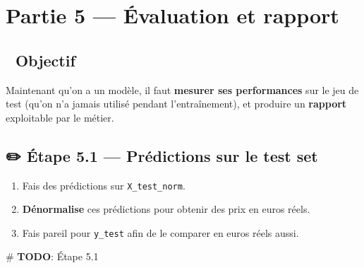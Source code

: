 \documentclass[
  french,
  11pt,
  a4paper,
]{scrbook}
\newenvironment{Shaded}{}{}
\newcommand{\AlertTok}[1]{\textcolor[rgb]{1.00,0.33,0.33}{\textbf{#1}}}
\newcommand{\CommentTok}[1]{\textcolor[rgb]{0.42,0.45,0.49}{#1}}
\providecommand{\tightlist}{%
  \setlength{\itemsep}{0pt}\setlength{\parskip}{0pt}}
\begin{document}
\chapter{Partie 5 --- Évaluation et
rapport}\label{partie-5-uxe9valuation-et-rapport}

\section{🎯 Objectif}\label{objectif-3}

Maintenant qu'on a un modèle, il faut \textbf{mesurer ses performances}
sur le jeu de test (qu'on n'a jamais utilisé pendant l'entraînement), et
produire un \textbf{rapport} exploitable par le métier.

\section{✏️ Étape 5.1 --- Prédictions sur le test
set}\label{uxe9tape-5.1-pruxe9dictions-sur-le-test-set}

\begin{tcolorbox}[enhanced jigsaw, arc=.35mm, bottomrule=.15mm, bottomtitle=1mm, breakable, colback=white, colbacktitle=quarto-callout-note-color!10!white, colframe=quarto-callout-note-color-frame, coltitle=black, left=2mm, leftrule=.75mm, opacityback=0, opacitybacktitle=0.6, rightrule=.15mm, title={📝 À faire}, titlerule=0mm, toprule=.15mm, toptitle=1mm]

\begin{enumerate}
\def\labelenumi{\arabic{enumi}.}
\tightlist
\item
  Fais des prédictions sur \texttt{X\_test\_norm}.
\item
  \textbf{Dénormalise} ces prédictions pour obtenir des prix en euros
  réels.
\item
  Fais pareil pour \texttt{y\_test} afin de le comparer en euros réels
  aussi.
\end{enumerate}

\end{tcolorbox}

\begin{Shaded}
\begin{Highlighting}[]
\CommentTok{\# }\AlertTok{TODO}\CommentTok{: Étape 5.1}
\end{Highlighting}
\end{Shaded}
\end{document}
